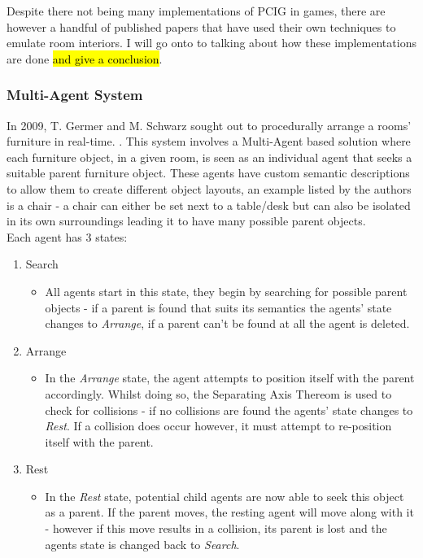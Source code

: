 \bigskip
Despite there not being many implementations of PCIG in games, there are however a handful of published papers that have used their own techniques to emulate room interiors. I will go onto to talking about how these implementations are done \hl{and give a conclusion}.

\bigskip
\subsubsection{Multi-Agent System}
In 2009, T. Germer and M. Schwarz sought out to procedurally arrange a rooms' furniture in real-time. \cite{real-time-walkthroughs}\cite{youtube:real-time-walkthroughs}. This system involves a Multi-Agent based solution where each furniture object, in a given room, is seen as an individual agent that seeks a suitable parent furniture object. These agents have custom semantic descriptions to allow them to create different object layouts, an example listed by the authors is a chair - a chair can either be set next to a table/desk but can also be isolated in its own surroundings leading it to have many possible parent objects.\\
Each agent has 3 states:
\begin{enumerate}
    \item Search
        \begin{itemize}
            \item All agents start in this state, they begin by searching for possible parent objects - if a parent is found that suits its semantics the agents' state changes to \textit{Arrange}, if a parent can't be found at all the agent is deleted.
        \end{itemize}
    \item Arrange
        \begin{itemize}
            \item In the \textit{Arrange} state, the agent attempts to position itself with the parent accordingly. Whilst doing so, the Separating Axis Thereom \cite{separating-axis-thereom} is used to check for collisions - if no collisions are found the agents' state changes to \textit{Rest}. If a collision does occur however, it must attempt to re-position itself with the parent.
        \end{itemize}
    \item Rest
        \begin{itemize}
            \item In the \textit{Rest} state, potential child agents are now able to seek this object as a parent. If the parent moves, the resting agent will move along with it - however if this move results in a collision, its parent is lost and the agents state is changed back to \textit{Search}.
        \end{itemize}
\end{enumerate}
